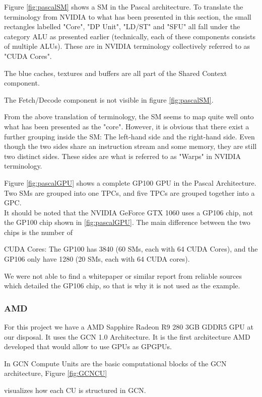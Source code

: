 Figure \ref{fig:pascalSM} shows a \gls{SM} in the Pascal architecture.
To translate the terminology from NVIDIA to what has been presented in this section, the small rectangles labelled "Core", "DP Unit", "LD/ST" and "SFU" all fall under the category \gls{ALU} as presented earlier (technically, each of these components consists of multiple \glspl{ALU}).
These are in NVIDIA terminology collectively referred to as "CUDA Cores".

The blue caches, textures and buffers are all part of the Shared Context component.

The Fetch/Decode component is not visible in figure \ref{fig:pascalSM}.

From the above translation of terminology, the \gls{SM} seems to map quite well onto what has been presented as the "core".
However, it is obvious that there exist a further grouping inside the \gls{SM}: The left-hand side and the right-hand side.
Even though the two sides share an instruction stream and some memory, they are still two distinct sides.
These sides are what is referred to as "Warps" in NVIDIA terminology.



Figure \ref{fig:pascalGPU} shows a complete GP100 GPU in the Pascal Architecture.
Two \glspl{SM} are grouped into one \glspl{TPC}, and five \glspl{TPC} are grouped together into a \gls{GPC}. \\

It should be noted that the NVIDIA GeForce GTX 1060 uses a GP106 chip, not the GP100 chip shown in \ref{fig:pascalGPU}. 
The main difference between the two chips is the number of {CUDA Cores: The GP100 has 3840 (60 \glspl{SM}, each with 64 CUDA Cores), and the GP106 only have 1280 (20 \glspl{SM}, each with 64 CUDA cores).

We were not able to find a whitepaper or similar report from reliable sources which detailed the GP106 chip, so that is why it is not used as the example. 


\subsubsection{AMD}
For this project we have a AMD Sapphire Radeon R9 280 3GB GDDR5 \gls{GPU} at our disposal. It uses the \gls{GCN} 1.0 Architecture.
It is the first architecture AMD developed that would allow to use \glspl{GPU} as \glspl{GPGPU}.


In \gls{GCN} Compute Units are the basic computational blocks of the \gls{GCN} architecture, Figure \ref{fig:GCNCU}} visualizes how each \gls{CU} is structured in \gls{GCN}.

